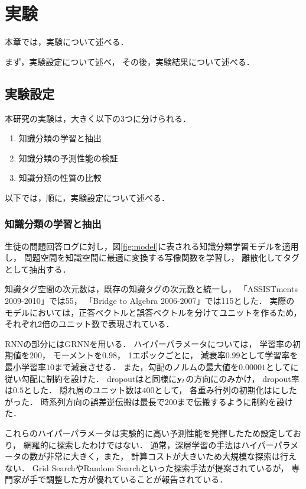 \chapter{実験}
\label{chap:result}
\fancyhf{}
\rhead{\thepage}
\cfoot{\thepage}


本章では，実験について述べる．

まず，実験設定について述べ，
その後，実験結果について述べる．


\section{実験設定}

本研究の実験は，大きく以下の3つに分けられる．
\begin{enumerate}
	\item 知識分類の学習と抽出
	\item 知識分類の予測性能の検証
	\item 知識分類の性質の比較
\end{enumerate}
以下では，順に，実験設定について述べる．


\subsection{知識分類の学習と抽出}
\label{sec:section}
生徒の問題回答ログに対し，図\ref{fig:model}に表される知識分類学習モデルを適用し，
問題空間を知識空間に最適に変換する写像関数を学習し，
離散化してタグとして抽出する．

知識タグ空間の次元数は，既存の知識タグの次元数と統一し，
「ASSISTments 2009-2010」では55，
「Bridge to Algebra 2006-2007」では115とした．
実際のモデルにおいては，正答ベクトルと誤答ベクトルを分けてユニットを作るため，
それぞれ2倍のユニット数で表現されている．

RNNの部分にはGRNNを用いる．
ハイパーパラメータについては，
学習率の初期値を$200$，
モーメントを$0.98$，
1エポックごとに，
減衰率$0.99$として学習率を最小学習率$10$まで減衰させる．
また，勾配のノルムの最大値を$0.00001$として\cite{pascanu2013difficulty}に従い勾配に制約を設けた．
dropoutは\cite{piech2015deep}と同様に${\bf y}_t$の方向にのみかけ，
dropout率は$0.5$とした．
隠れ層のユニット数は$400$として，
各重み行列の初期化は\cite{glorot2010understanding}にしたがった．
時系列方向の誤差逆伝搬は最長で$200$まで伝搬するように制約を設けた．

これらのハイパーパラメータは実験的に高い予測性能を発揮したため設定しており，
網羅的に探索したわけではない．
通常，深層学習の手法はハイパーパラメータの数が非常に大きく，また，
計算コストが大きいため大規模な探索は行えない．
Grid SearchやRandom Search\cite{bergstra2012random}といった探索手法が提案されているが，
専門家が手で調整した方が優れていることが報告されている\cite{larochelle2007empirical, bergstra2012random}．

